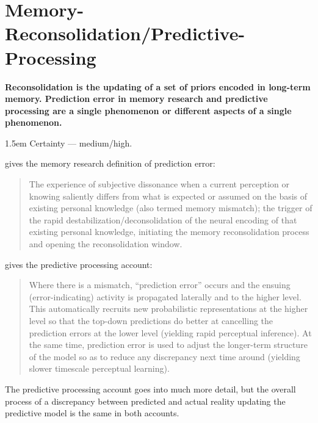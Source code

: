 \documentclass[11pt,oneside]{book}
\newcommand{\claim}[2]{%
    \par\medskip\noindent\textbf{#1}%
    \begin{adjustwidth}{1.5em}{}%
    \setlength{\parindent}{0pt}%
    \setlength{\parskip}{0.5\baselineskip}%
    #2%
    \end{adjustwidth}%
}
\begin{document}
\section*{Memory-Reconsolidation/Predictive-Processing}
\claim{Reconsolidation is the updating of a set of priors encoded in long-term memory. Prediction error in memory research and predictive processing are a single phenomenon or different aspects of a single phenomenon.}{Certainty --- medium/high.

\textcite[p. 367]{eckerUnlocking} gives the memory research definition of prediction error:
\begin{quotation}
    The experience of subjective dissonance when a current perception or knowing saliently differs from what is expected or assumed on the basis of existing personal knowledge (also termed memory mismatch); the trigger of the rapid destabilization/deconsolidation of the neural encoding of that existing personal knowledge, initiating the memory reconsolidation process and opening the reconsolidation window.
\end{quotation}

\textcite[p. 30--31]{clark2015surfing} gives the predictive processing account:
\begin{quotation}
    Where there is a mismatch, \enquote{prediction error} occurs and the ensuing (error-indicating) activity is propagated laterally and to the higher level. This automatically recruits new probabilistic representations at the higher level so that the top-down predictions do better at cancelling the prediction errors at the lower level (yielding rapid perceptual inference). At the same time, prediction error is used to adjust the longer-term structure of the model so as to reduce any discrepancy next time around (yielding slower timescale perceptual learning).
\end{quotation}

The predictive processing account goes into much more detail, but the overall process of a discrepancy between predicted and actual reality updating the predictive model is the same in both accounts.}
\end{document}
